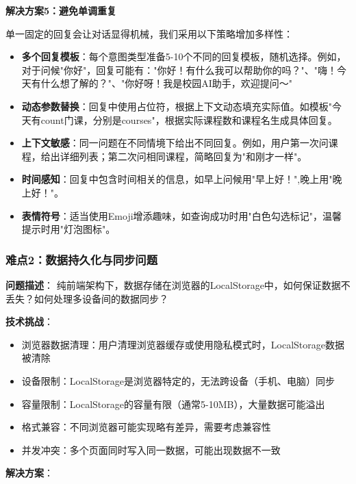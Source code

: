 \documentclass[12pt,a4paper]{article}
\begin{document}
\textbf{解决方案5：避免单调重复}

单一固定的回复会让对话显得机械，我们采用以下策略增加多样性：

\begin{itemize}
    \item \textbf{多个回复模板}：每个意图类型准备5-10个不同的回复模板，随机选择。例如，对于问候"你好"，回复可能有："你好！有什么我可以帮助你的吗？"、"嗨！今天有什么想了解的？"、"你好呀！我是校园AI助手，欢迎提问～"
    
    \item \textbf{动态参数替换}：回复中使用占位符，根据上下文动态填充实际值。如模板"今天有{count}门课，分别是{courses}"，根据实际课程数和课程名生成具体回复。
    
    \item \textbf{上下文敏感}：同一问题在不同情境下给出不同回复。例如，用户第一次问课程，给出详细列表；第二次问相同课程，简略回复为"和刚才一样"。
    
    \item \textbf{时间感知}：回复中包含时间相关的信息，如早上问候用"早上好！",晚上用"晚上好！"。
    
    \item \textbf{表情符号}：适当使用Emoji增添趣味，如查询成功时用"白色勾选标记"，温馨提示时用"灯泡图标"。
\end{itemize}

\subsubsection{难点2：数据持久化与同步问题}

\textbf{问题描述}：
纯前端架构下，数据存储在浏览器的LocalStorage中，如何保证数据不丢失？如何处理多设备间的数据同步？

\textbf{技术挑战}：
\begin{itemize}
    \item 浏览器数据清理：用户清理浏览器缓存或使用隐私模式时，LocalStorage数据被清除
    \item 设备限制：LocalStorage是浏览器特定的，无法跨设备（手机、电脑）同步
    \item 容量限制：LocalStorage的容量有限（通常5-10MB），大量数据可能溢出
    \item 格式兼容：不同浏览器可能实现略有差异，需要考虑兼容性
    \item 并发冲突：多个页面同时写入同一数据，可能出现数据不一致
\end{itemize}

\textbf{解决方案}：
\end{document}
